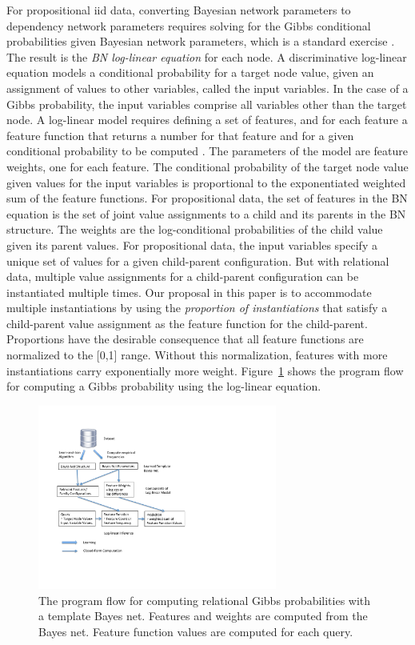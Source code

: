 \documentclass[runningheads,a4paper]{llncs}
\begin{document}
For propositional iid data, converting Bayesian network parameters to dependency network parameters requires solving for the Gibbs conditional probabilities given Bayesian network parameters, which is a standard exercise \cite[Ch.14.5.2]{Russell2010}. The result is the {\em BN log-linear equation} for each node. A discriminative log-linear equation models a conditional probability for a target node value, given an assignment of values to other variables, called the input variables. In the case of a Gibbs probability, the input variables comprise all variables other than the target node. A log-linear model requires defining a set of features, and for each feature a feature function that returns a number for that feature and for a given conditional probability to be computed \cite{Sutton2007}. The parameters of the model are feature weights, one for each feature. The conditional probability of the target node value given values for the input variables is proportional to the exponentiated weighted sum of the feature functions. For propositional data, the  set of features in the BN equation is the set of joint value assignments to a child and its parents in the BN structure. The weights are the log-conditional probabilities of the child value given its parent values. For propositional data, the input variables specify a unique set of values for a given child-parent configuration. But with relational data, multiple value assignments for a child-parent configuration can be instantiated multiple times. Our proposal in this paper is to accommodate multiple instantiations by using the {\em proportion of instantiations} that satisfy a child-parent value assignment as the feature function for the child-parent. Proportions have the desirable consequence that all feature functions are normalized to the [0,1] range. Without this normalization, features with more instantiations carry exponentially more weight.  Figure~\ref{fig:bn-flow} shows the program flow for computing a Gibbs probability using the log-linear equation.

\begin{figure}[htbp]

\begin{center}
\includegraphics[width=0.7\textwidth]{bn-regress}
\caption{The program flow for computing relational Gibbs probabilities with a template Bayes net. Features and weights are computed from the Bayes net. Feature function values are computed for each query.}
\label{fig:bn-flow}
\end{center}

\end{figure}
\end{document}
